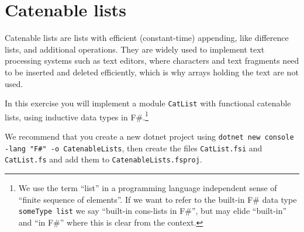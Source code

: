\section*{Catenable lists}

Catenable lists are lists with efficient (constant-time) appending, like difference lists, and additional operations.  They are widely used to implement text processing systems such as text editors, where characters and text fragments need to be inserted and deleted efficiently, which is why arrays holding the text are not used.

In this exercise you will implement a module \texttt{CatList} with functional catenable lists, using inductive data types in F\#.\footnote{We use the term ``list'' in a programming language independent sense of ``finite sequence of elements''.  If we want to refer to the built-in F\# data type \texttt{someType list} we say ``built-in cons-lists in F\#'', but may elide ``built-in'' and ``in F\#'' where this is clear from the context.}


We recommend that you create a new dotnet project using \texttt{dotnet new console -lang "F\#" -o CatenableLists}, then create the files \texttt{CatList.fsi} and \texttt{CatList.fs} and add them to \texttt{CatenableLists.fsproj}.

